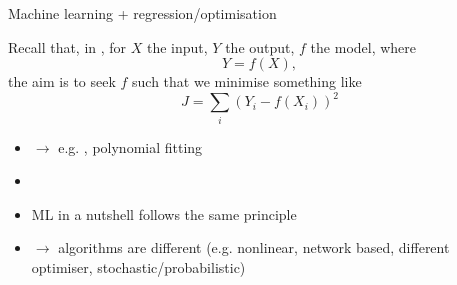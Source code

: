 \documentclass[xcolor=x11names,compress]{beamer}
\renewcommand{\(}{\begin{columns}}
\renewcommand{\)}{\end{columns}}
\newcommand{\<}[1]{\begin{column}{#1}}
\renewcommand{\>}{\end{column}}
\begin{document}









\begin{frame}{Machine learning + regression/optimisation}

Recall that, in , for $X$ the input, $Y$ the output, $f$ the model, where
\begin{equation*}
    Y = f(X),
\end{equation*}
the aim is to seek $f$ such that we minimise something like
\begin{equation*}
    J = \sum_i (Y_i - f(X_i))^2
\end{equation*}
\begin{itemize}
  \item[] $\to$ e.g. , polynomial fitting
  \item[]
  \item ML in a nutshell follows the same principle
  \item[] $\to$ algorithms are different (e.g. nonlinear, network based,
  different optimiser, stochastic/probabilistic)
\end{itemize}

\end{frame}

\end{document}

